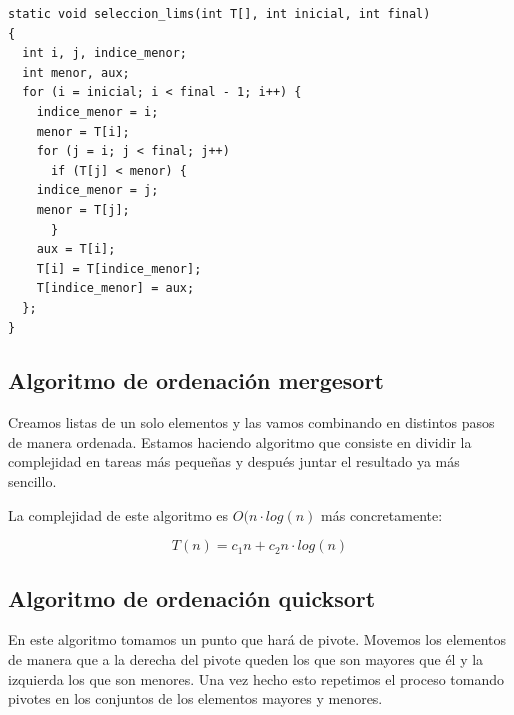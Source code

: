 \documentclass{article}
\begin{document}
\begin{lstlisting}
static void seleccion_lims(int T[], int inicial, int final)
{
  int i, j, indice_menor;
  int menor, aux;
  for (i = inicial; i < final - 1; i++) {
    indice_menor = i;
    menor = T[i];
    for (j = i; j < final; j++)
      if (T[j] < menor) {
	indice_menor = j;
	menor = T[j];
      }
    aux = T[i];
    T[i] = T[indice_menor];
    T[indice_menor] = aux;
  };
}

\end{lstlisting}



\subsection{Algoritmo de ordenación mergesort}

Creamos listas de un solo elementos y las vamos combinando en
distintos pasos de manera ordenada. Estamos haciendo algoritmo que
consiste en dividir la complejidad en tareas más pequeñas y después
juntar el resultado ya más sencillo.

La complejidad de este algoritmo es $O(n\cdot log(n)$ más concretamente:

$$T(n) = c_1n + c_2n\cdot log(n)$$


\subsection{Algoritmo de ordenación quicksort}

En este algoritmo tomamos un punto que hará de pivote. Movemos los
elementos de manera que a la derecha del pivote queden los que son
mayores que él y la izquierda los que son menores. Una vez hecho esto
repetimos el proceso tomando pivotes en los conjuntos de los elementos
mayores y menores.
\end{document}
